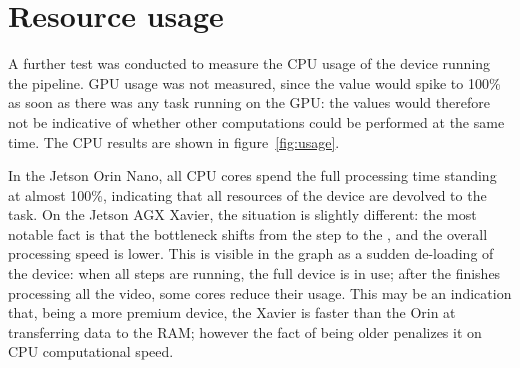\section{Resource usage}

A further test was conducted to measure the CPU usage of the device running the pipeline.
GPU usage was not measured, since the value would spike to 100\% as soon as there was any task running on the GPU: the values would therefore not be indicative of whether other computations could be performed at the same time.
The CPU results are shown in figure~\ref{fig:usage}.

In the Jetson Orin Nano, all CPU cores spend the full processing time standing at almost 100\%, indicating that all resources of the device are devolved to the task.
On the Jetson AGX Xavier, the situation is slightly different: the most notable fact is that the bottleneck shifts from the \locate* step to the \match*, and the overall processing speed is lower.
This is visible in the graph as a sudden de-loading of the device: when all steps are running, the full device is in use; after the \locate* finishes processing all the video, some cores reduce their usage.
This may be an indication that, being a more premium device, the Xavier is faster than the Orin at transferring data to the RAM; however the fact of being older penalizes it on CPU computational speed.

